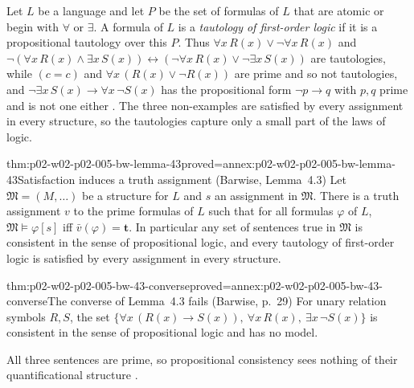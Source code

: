 Let \(L\) be a language and let \(P\) be the set of formulas of \(L\) that
are atomic or begin with \(\forall\) or \(\exists\).  A formula of \(L\) is a
\emph{tautology of first-order logic} if it is a propositional tautology
over this \(P\).  Thus \(\forall x\,R(x)\lor\neg\forall x\,R(x)\) and
\(\neg(\forall x\,R(x)\land\exists x\,S(x))\leftrightarrow
(\neg\forall x\,R(x)\lor\neg\exists x\,S(x))\) are tautologies, while
\((c=c)\) and \(\forall x\,(R(x)\lor\neg R(x))\) are prime and so not
tautologies, and \(\neg\exists x\,S(x)\to\forall x\,\neg S(x)\) has the
propositional form \(\neg p\to q\) with \(p,q\) prime and is not one
either \cite[ch.~A.1, \S4, p.~28]{Barwise1977FirstOrder}.  The three
non-examples are satisfied by every assignment in every structure, so the
tautologies capture only a small part of the laws of logic.

\begin{hblemma}{thm:p02-w02-p02-005-bw-lemma-43}{proved=annex:p02-w02-p02-005-bw-lemma-43}{Satisfaction induces a truth assignment (Barwise, Lemma~4.3)}
Let \(\mathfrak M=(M,\ldots)\) be a structure for \(L\) and \(s\) an
assignment in \(\mathfrak M\).  There is a truth assignment \(v\) to the
prime formulas of \(L\) such that for all formulas \(\varphi\) of \(L\),
\(\mathfrak M\models\varphi[s]\) iff \(\bar v(\varphi)=\mathbf t\).  In
particular any set of sentences true in \(\mathfrak M\) is consistent in
the sense of propositional logic, and every tautology of first-order logic
is satisfied by every assignment in every structure.
\end{hblemma}

\begin{hbtheorem}{thm:p02-w02-p02-005-bw-43-converse}{proved=annex:p02-w02-p02-005-bw-43-converse}{The converse of Lemma~4.3 fails (Barwise, p.~29)}
For unary relation symbols \(R,S\), the set
\(\{\forall x\,(R(x)\to S(x)),\ \forall x\,R(x),\ \exists x\,\neg S(x)\}\)
is consistent in the sense of propositional logic and has no model.
\end{hbtheorem}

All three sentences are prime, so propositional consistency sees nothing
of their quantificational structure \cite[ch.~A.1, \S4, p.~29]{Barwise1977FirstOrder}.

